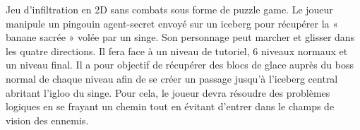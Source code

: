 Jeu d’infiltration en 2\+D sans combats sous forme de puzzle game. Le joueur manipule un pingouin agent-\/secret envoyé sur un iceberg pour récupérer la « banane sacrée » volée par un singe. Son personnage peut marcher et glisser dans les quatre directions. Il fera face à un niveau de tutoriel, 6 niveaux normaux et un niveau final. Il a pour objectif de récupérer des blocs de glace auprès du boss normal de chaque niveau afin de se créer un passage jusqu’à l’iceberg central abritant l’igloo du singe. Pour cela, le joueur devra résoudre des problèmes logiques en se frayant un chemin tout en évitant d’entrer dans le champs de vision des ennemis. 

~\newline
 